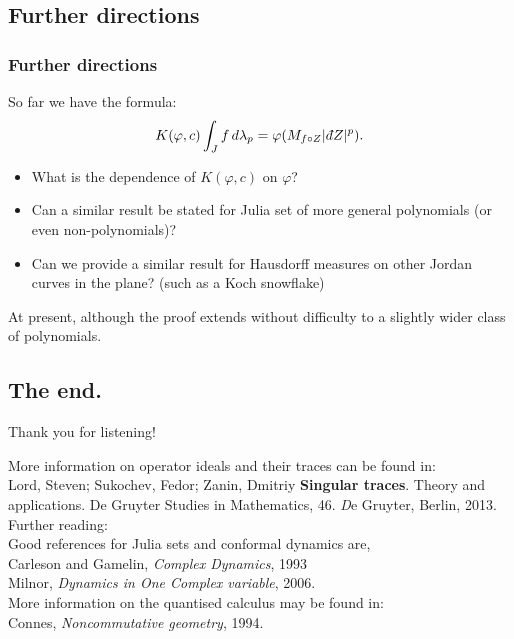 \documentclass{beamer} %
\theoremstyle{definition} %
\newcommand{\Itgr}{\mathbb{Z}}
\newcommand{\Circ}{\mathbb{T}}
\newcommand{\sgn}{\mathrm{sgn}}
\def\qd{\,{\mathchar'26\mkern-12mu d}}
\begin{document}
\subsection{Further directions}
\begin{frame}\frametitle{Further directions}
    So far we have the formula:
    \begin{equation*}
        K(\varphi,c)\int_J f\,d\lambda_p = \varphi(M_{f\circ Z}|\qd Z|^p).
    \end{equation*}
    \begin{itemize}
        \item{} What is the dependence of $K(\varphi,c)$ on $\varphi$?
        \item{} Can a similar result be stated for Julia set of more general polynomials (or even non-polynomials)?
        \item{} Can we provide a similar result for Hausdorff measures on other Jordan curves in the plane? (such as a Koch snowflake)
    \end{itemize}
    At present, although the proof extends without difficulty to a slightly wider class of polynomials.
\end{frame}

\subsection{The end.}
\begin{frame}
    Thank you for listening!
    
    More information on operator ideals and their traces can be found in:\\
    Lord, Steven; Sukochev, Fedor; Zanin, Dmitriy {\bf Singular traces}. Theory and applications. De Gruyter Studies in Mathematics, 46. {\emph De Gruyter, Berlin}, 2013.\\
    
    Further reading:\\
    Good references for Julia sets and conformal dynamics are,\\
    Carleson and Gamelin, \emph{ Complex Dynamics}, 1993\\
    Milnor, \emph{Dynamics in One Complex variable}, 2006.\\
    
    More information on the quantised calculus may be found in:\\
    Connes, \emph{Noncommutative geometry}, 1994.
\end{frame}


% 
\end{document}
